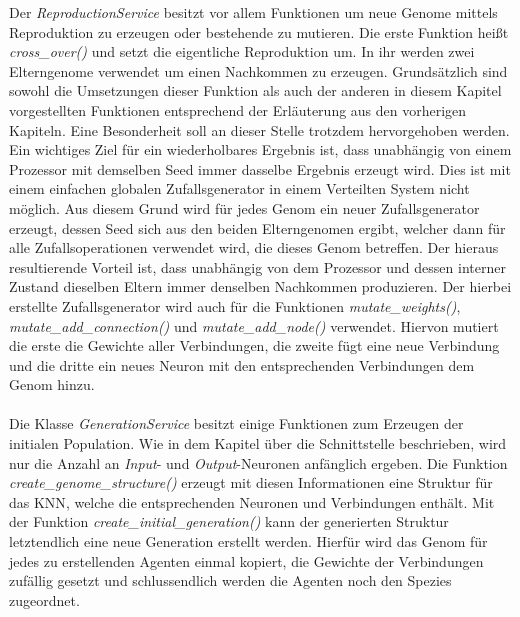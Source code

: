 Der \emph{ReproductionService} besitzt vor allem Funktionen um neue Genome mittels Reproduktion zu erzeugen oder bestehende zu mutieren. Die erste Funktion heißt \emph{cross\_over()} und setzt die eigentliche Reproduktion um. In ihr werden zwei Elterngenome verwendet um einen Nachkommen zu erzeugen. Grundsätzlich sind sowohl die Umsetzungen dieser Funktion als auch der anderen in diesem Kapitel vorgestellten Funktionen entsprechend der Erläuterung aus den vorherigen Kapiteln. Eine Besonderheit soll an dieser Stelle trotzdem hervorgehoben werden. Ein wichtiges Ziel für ein wiederholbares Ergebnis ist, dass unabhängig von einem Prozessor mit demselben Seed immer dasselbe Ergebnis erzeugt wird. Dies ist mit einem einfachen globalen Zufallsgenerator in einem Verteilten System nicht möglich. Aus diesem Grund wird für jedes Genom ein neuer Zufallsgenerator erzeugt, dessen Seed sich aus den beiden Elterngenomen ergibt, welcher dann für alle Zufallsoperationen verwendet wird, die dieses Genom betreffen. Der hieraus resultierende Vorteil ist, dass unabhängig von dem Prozessor und dessen interner Zustand dieselben Eltern immer denselben Nachkommen produzieren. Der hierbei erstellte Zufallsgenerator wird auch für die Funktionen \emph{mutate\_weights()}, \emph{mutate\_add\_connection()} und \emph{mutate\_add\_node()} verwendet. Hiervon mutiert die erste die Gewichte aller Verbindungen, die zweite fügt eine neue Verbindung und die dritte ein neues Neuron mit den entsprechenden Verbindungen dem Genom hinzu. 
\\\\
Die Klasse \emph{GenerationService} besitzt einige Funktionen zum Erzeugen der initialen Population. Wie in dem Kapitel über die Schnittstelle beschrieben, wird nur die Anzahl an \emph{Input}- und \emph{Output}-Neuronen anfänglich ergeben. Die Funktion \emph{create\_genome\_structure()} erzeugt mit diesen Informationen eine Struktur für das \ac{KNN}, welche die entsprechenden Neuronen und Verbindungen enthält. Mit der Funktion \emph{create\_initial\_generation()} kann der generierten Struktur letztendlich eine neue Generation erstellt werden. Hierfür wird das Genom für jedes zu erstellenden Agenten einmal kopiert, die Gewichte der Verbindungen zufällig gesetzt und schlussendlich werden die Agenten noch den Spezies zugeordnet.
\\\\
